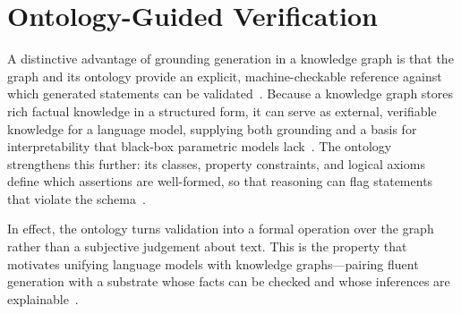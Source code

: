 \section{Ontology-Guided Verification}
\label{sec:gr-verification}

A distinctive advantage of grounding generation in a knowledge graph is that the
graph and its ontology provide an explicit, machine-checkable reference against
which generated statements can be validated~\cite{pan2024unifying}. Because a
knowledge graph stores rich factual knowledge in a structured form, it can serve
as external, verifiable knowledge for a language model, supplying both grounding
and a basis for interpretability that black-box parametric models
lack~\cite{pan2024unifying}. The ontology strengthens this further: its classes,
property constraints, and logical axioms define which assertions are well-formed,
so that reasoning can flag statements that violate the schema~\cite{w3c2012owl,
hogan2021kg}.

In effect, the ontology turns validation into a formal operation over the graph
rather than a subjective judgement about text. This is the property that
motivates unifying language models with knowledge graphs---pairing fluent
generation with a substrate whose facts can be checked and whose inferences are
explainable~\cite{pan2024unifying, hogan2021kg}.
